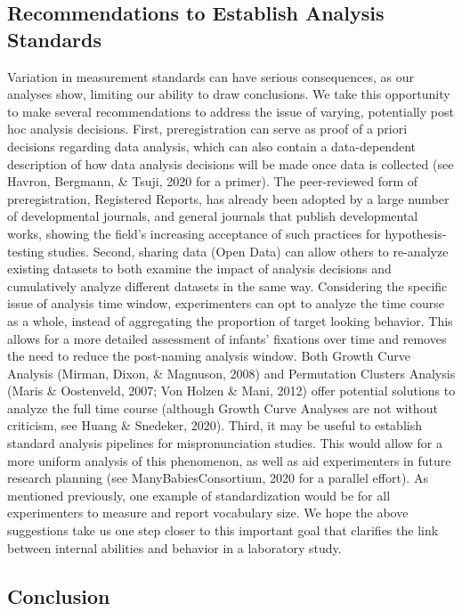 \documentclass[
  english,
  man, noextraspace]{apa6}
\begin{document}
\hypertarget{recommendations-to-establish-analysis-standards}{%
\subsection{Recommendations to Establish Analysis Standards}\label{recommendations-to-establish-analysis-standards}}

Variation in measurement standards can have serious consequences, as our analyses show, limiting our ability to draw conclusions. We take this opportunity to make several recommendations to address the issue of varying, potentially post hoc analysis decisions. First, preregistration can serve as proof of a priori decisions regarding data analysis, which can also contain a data-dependent description of how data analysis decisions will be made once data is collected (see Havron, Bergmann, \& Tsuji, 2020 for a primer). The peer-reviewed form of preregistration, Registered Reports, has already been adopted by a large number of developmental journals, and general journals that publish developmental works, showing the field's increasing acceptance of such practices for hypothesis-testing studies. Second, sharing data (Open Data) can allow others to re-analyze existing datasets to both examine the impact of analysis decisions and cumulatively analyze different datasets in the same way. Considering the specific issue of analysis time window, experimenters can opt to analyze the time course as a whole, instead of aggregating the proportion of target looking behavior. This allows for a more detailed assessment of infants' fixations over time and removes the need to reduce the post-naming analysis window. Both Growth Curve Analysis (Mirman, Dixon, \& Magnuson, 2008) and Permutation Clusters Analysis (Maris \& Oostenveld, 2007; Von Holzen \& Mani, 2012) offer potential solutions to analyze the full time course (although Growth Curve Analyses are not without criticism, see Huang \& Snedeker, 2020). Third, it may be useful to establish standard analysis pipelines for mispronunciation studies. This would allow for a more uniform analysis of this phenomenon, as well as aid experimenters in future research planning (see ManyBabiesConsortium, 2020 for a parallel effort). As mentioned previously, one example of standardization would be for all experimenters to measure and report vocabulary size. We hope the above suggestions take us one step closer to this important goal that clarifies the link between internal abilities and behavior in a laboratory study.

\hypertarget{conclusion}{%
\subsection{Conclusion}\label{conclusion}}
\end{document}
